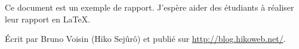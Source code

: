 Ce document est un exemple de rapport. J'espère aider des étudiants à réaliser leur rapport en \LaTeX.

Écrit par Bruno Voisin (Hiko Sejûrô) et publié sur \url{http://blog.hikoweb.net/}.


